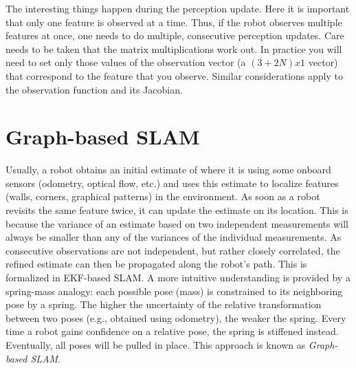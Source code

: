 \documentclass[paper=6.14in:9.21in,pagesize=pdftex,11pt,twoside,openright]{scrbook}
\begin{document}
The interesting things happen during the perception update. Here it is important that only one feature is observed at a time. Thus, if the robot observes multiple features at once, one needs to do multiple, consecutive perception updates. Care needs to be taken that the matrix multiplications work out. In practice you will need to set only those values of the observation vector (a $(3+2N)x1$ vector) that correspond to the feature that you observe. Similar considerations apply to the observation function and its Jacobian.

\section{Graph-based SLAM}
Usually, a robot obtains an initial estimate of where it is using some onboard sensors (odometry, optical flow, etc.) and uses this estimate to localize features (walls, corners, graphical patterns) in the environment. As soon as a robot revisits the same feature twice, it can update the estimate on its location. This is because the variance of an estimate based on two independent measurements will always be smaller than any of the variances of the individual measurements. As consecutive observations are not independent, but rather closely correlated, the refined estimate can then be propagated along the robot's path. This is formalized in EKF-based SLAM. A more intuitive understanding is provided by a spring-mass analogy: each possible pose (mass) is constrained to its neighboring pose by a spring. The higher the uncertainty of the relative transformation between two poses (e.g., obtained using odometry), the weaker the spring. Every time a robot gains confidence on a relative pose, the spring is stiffened instead. Eventually, all poses will be pulled in place. This approach is known as \emph{Graph-based SLAM}. 
\end{document}
